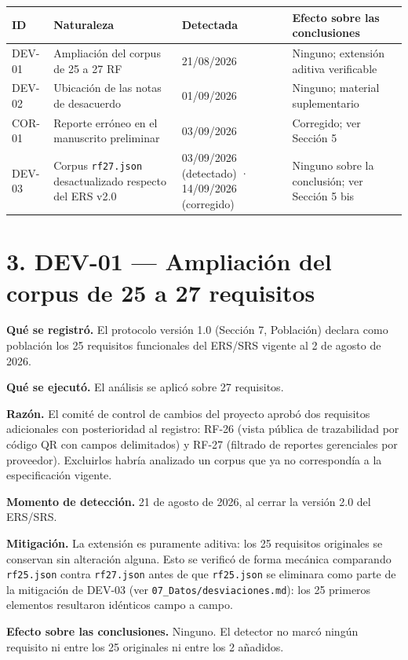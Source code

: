 \documentclass[11pt,a4paper]{article}
\begin{document}
\begin{longtable}{p{1.6cm}p{5.2cm}p{2.2cm}p{5.6cm}}
\toprule
\textbf{ID} & \textbf{Naturaleza} & \textbf{Detectada} & \textbf{Efecto sobre las
conclusiones} \\
\midrule
\endhead
DEV-01 & Ampliación del corpus de 25 a 27 RF & 21/08/2026 & Ninguno; extensión
aditiva verificable \\
DEV-02 & Ubicación de las notas de desacuerdo & 01/09/2026 & Ninguno; material
suplementario \\
COR-01 & Reporte erróneo en el manuscrito preliminar & 03/09/2026 & Corregido;
ver Sección 5 \\
DEV-03 & Corpus \texttt{rf27.json} desactualizado respecto del ERS v2.0 & 03/09/2026
(detectado) · 14/09/2026 (corregido) & Ninguno sobre la conclusión; ver Sección 5 bis \\
\bottomrule
\end{longtable}

\section*{3. DEV-01 --- Ampliación del corpus de 25 a 27 requisitos}

\textbf{Qué se registró.} El protocolo versión 1.0 (Sección 7, Población)
declara como población los 25 requisitos funcionales del ERS/SRS vigente al
2 de agosto de 2026.

\textbf{Qué se ejecutó.} El análisis se aplicó sobre 27 requisitos.

\textbf{Razón.} El comité de control de cambios del proyecto aprobó dos
requisitos adicionales con posterioridad al registro: RF-26 (vista pública de
trazabilidad por código QR con campos delimitados) y RF-27 (filtrado de
reportes gerenciales por proveedor). Excluirlos habría analizado un corpus que
ya no correspondía a la especificación vigente.

\textbf{Momento de detección.} 21 de agosto de 2026, al cerrar la versión 2.0
del ERS/SRS.

\textbf{Mitigación.} La extensión es puramente aditiva: los 25 requisitos
originales se conservan sin alteración alguna. Esto se verificó de forma
mecánica comparando \texttt{rf25.json} contra \texttt{rf27.json} antes de que
\texttt{rf25.json} se eliminara como parte de la mitigación de DEV-03 (ver
\texttt{07\_Datos/desviaciones.md}): los 25 primeros elementos resultaron
idénticos campo a campo.

\textbf{Efecto sobre las conclusiones.} Ninguno. El detector no marcó ningún
requisito ni entre los 25 originales ni entre los 2 añadidos.
\end{document}
